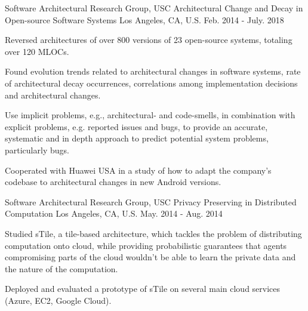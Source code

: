 \begin{cventries}
  \cventry
    {{Software Architectural Research Group}, USC} %
    {Architectural Change and Decay in Open-source Software Systems} %
    {Los Angeles, CA, U.S.} %
    {Feb. 2014 - July. 2018} %
    {
      \begin{cvitems} %
        \item Reversed architectures of over 800 versions of 23 open-source systems, totaling over 120 MLOCs.
        \item Found evolution trends related to architectural changes in software systems, rate of architectural decay occurrences, correlations among implementation decisions and architectural changes.
        \item Use implicit problems, e.g.,
        architectural- and code-smells, in combination with explicit problems, e.g. reported issues and bugs, to provide an accurate, systematic and in depth approach to predict potential system problems, particularly bugs.
        \item Cooperated with Huawei USA in a study of how to adapt the company's codebase to architectural changes in new Android versions.
      \end{cvitems}
    }
   
\cventry
{{Software Architectural Research Group}, USC} %
{Privacy Preserving in Distributed Computation} %
{Los Angeles, CA, U.S.} %
{May. 2014 - Aug. 2014} %
{
  	\begin{cvitems} %
  		\item Studied sTile, a tile-based architecture, which tackles the problem of distributing computation onto cloud, while providing probabilistic guarantees that agents compromising parts of the cloud wouldn't be able to learn the private data and the nature of the computation.
  		\item Deployed and evaluated a prototype of sTile on several main cloud services (Azure, EC2, Google Cloud).
  	\end{cvitems}
}


\end{cventries}
